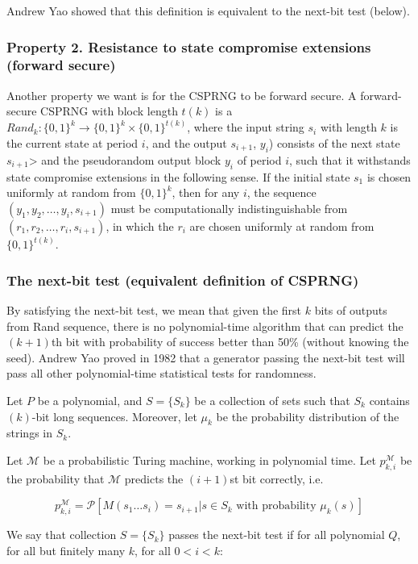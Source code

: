 \documentclass[12pt]{article}
\begin{document}
Andrew Yao showed that this definition is equivalent to the next-bit test (below).

\subsubsection*{Property 2. Resistance to state compromise extensions (forward secure)}
Another property we want is for the CSPRNG to be forward secure. A forward-secure CSPRNG with block length $t(k)$ is a $Rand_{k} \colon \{0,1\}^k \to \{0,1\}^k \times \{0,1\}^{t(k)}$, where the input string $s_i$ with length $k$ is the current state at period $i$, and the output $s_{i+1}$, $y_i$) consists of the next state $s_{i+1}$> and the pseudorandom output block $y_i$ of period $i$, such that it withstands state compromise extensions in the following sense. If the initial state $s_1$ is chosen uniformly at random from $\{0,1\}^k$, then for any $i$, the sequence $(y_1, y_2,\dots, y_i,s_{i+1})$ must be computationally indistinguishable from $(r_1,r_2,\dots,r_i,s_{i+1})$, in which the $r_i$ are chosen uniformly at random from $\{0,1\}^{t(k)}$.

\subsubsection*{The next-bit test (equivalent definition of CSPRNG)}
By satisfying the next-bit test, we mean that given the first $k$ bits of outputs from Rand sequence, there is no polynomial-time algorithm that can predict the $(k+1)$th bit with probability of success better than 50\% (without knowing the seed). Andrew Yao proved in 1982 that a generator passing the next-bit test will pass all other polynomial-time statistical tests for randomness.

Let $P$ be a polynomial, and $S=\{S_k\}$ be a collection of sets such that $S_k$ contains $(k)$-bit long sequences. Moreover, let $\mu_k$ be the probability distribution of the strings in $S_k$.

Let $\mathcal{M}$ be a probabilistic Turing machine, working in polynomial time. Let $p_{k,i}^{\mathcal{M}}$ be the probability that $\mathcal{M}$ predicts the $(i+1)$st bit correctly, i.e.

$$p_{k,i}^{\mathcal{M}}={\mathcal{P}}[M(s_1\ldots s_i)=s_{i+1} | s\in S_k\text{ with probability }\mu_k(s)]$$

We say that collection $S = \{ S_k \}$ passes the next-bit test if for all polynomial $Q$, for all but finitely many $k$, for all $0 < i < k$: 
\end{document}
